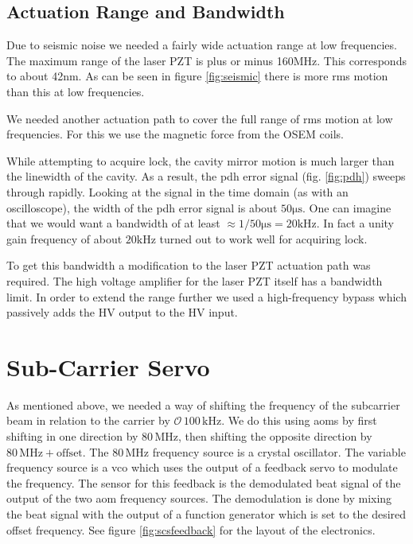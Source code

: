 \subsection{Actuation Range and Bandwidth}
Due to seismic noise we needed a fairly wide actuation range at low frequencies.
The maximum range of the laser PZT is plus or minus 160MHz.
This corresponds to about 42nm.
As can be seen in figure \ref{fig:seismic} there is more rms motion than this
at low frequencies.

We needed another actuation path to cover the full range of rms motion at low
frequencies.
For this we use the magnetic force from the OSEM coils.

While attempting to acquire lock, the cavity mirror motion is much larger than
the linewidth of the cavity.
As a result, the \ac{pdh} error signal (fig. \ref{fig:pdh}) sweeps through
rapidly.
Looking at the signal in the time domain (as with an oscilloscope), the
width of the \ac{pdh} error signal is about $50\mathrm{\mu s}$.
One can imagine that we would want a bandwidth of at least
$\approx 1/50\mathrm{\mu s} = 20\mathrm{kHz}$.
In fact a unity gain frequency of about $20\mathrm{kHz}$ turned out to work
well for acquiring lock.

To get this bandwidth a modification to the laser PZT actuation path was
required.
The high voltage amplifier for the laser PZT itself has a bandwidth limit.
In order to extend the range further we used a high-frequency
bypass which passively adds the HV output to the HV input.


\section{Sub-Carrier Servo}
\label{sec:scservo}
As mentioned above, we needed a way of shifting the frequency of the subcarrier
beam in relation to the carrier by $\mathcal{O}\, 100\,\mathrm{kHz}$.
We do this using \ac{aom}s by first shifting in one direction by
$80\,\mathrm{MHz}$, then shifting the opposite direction by
$80\,\mathrm{MHz} + \mathrm{offset}$.
The $80\,\mathrm{MHz}$ frequency source is a crystal oscillator.
The variable frequency source is a \ac{vco} which uses the output of a feedback
servo to modulate the frequency.
The sensor for this feedback is the demodulated beat signal of the output of
the two \ac{aom} frequency sources.
The demodulation is done by mixing the beat signal with the output of a
function generator which is set to the desired offset frequency.
See figure \ref{fig:scsfeedback} for the layout of the electronics.

